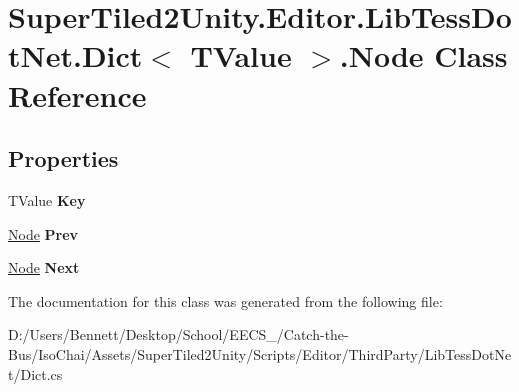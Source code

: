 \hypertarget{class_super_tiled2_unity_1_1_editor_1_1_lib_tess_dot_net_1_1_dict_1_1_node}{}\section{Super\+Tiled2\+Unity.\+Editor.\+Lib\+Tess\+Dot\+Net.\+Dict$<$ T\+Value $>$.Node Class Reference}
\label{class_super_tiled2_unity_1_1_editor_1_1_lib_tess_dot_net_1_1_dict_1_1_node}
\subsection*{Properties}
\begin{DoxyCompactItemize}
\item 
\mbox{\label{class_super_tiled2_unity_1_1_editor_1_1_lib_tess_dot_net_1_1_dict_1_1_node_adef26fe4c248cdd03915dfd9fab42aa6}} 
T\+Value {\bfseries Key}
\item 
\mbox{\label{class_super_tiled2_unity_1_1_editor_1_1_lib_tess_dot_net_1_1_dict_1_1_node_aea9dcff6b01ce4e35c1836852ca244ac}} 
\mbox{\hyperlink{class_super_tiled2_unity_1_1_editor_1_1_lib_tess_dot_net_1_1_dict_1_1_node}{Node}} {\bfseries Prev}
\item 
\mbox{\label{class_super_tiled2_unity_1_1_editor_1_1_lib_tess_dot_net_1_1_dict_1_1_node_a5e54821e9e886c0acd19d996b54fd664}} 
\mbox{\hyperlink{class_super_tiled2_unity_1_1_editor_1_1_lib_tess_dot_net_1_1_dict_1_1_node}{Node}} {\bfseries Next}
\end{DoxyCompactItemize}


The documentation for this class was generated from the following file\+:\begin{DoxyCompactItemize}
\item 
D\+:/\+Users/\+Bennett/\+Desktop/\+School/\+E\+E\+C\+S\+\_/\+Catch-\/the-\/\+Bus/\+Iso\+Chai/\+Assets/\+Super\+Tiled2\+Unity/\+Scripts/\+Editor/\+Third\+Party/\+Lib\+Tess\+Dot\+Net/Dict.\+cs\end{DoxyCompactItemize}
